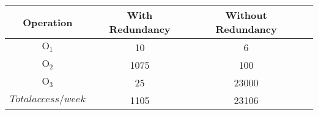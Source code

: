 \begin{table}[!h]
	\begin{center}
		\begin{tabular}{ | c | c | c | c | }
			\hline
			\textbf{Operation} & \textbf{With Redundancy} & \textbf{Without Redundancy} \\ \hline
			$ \textrm{O}_\textrm{1} $ & 10 & 6\\ \hline
			$ \textrm{O}_\textrm{2} $ & 1075 & 100 \\ \hline
			$ \textrm{O}_\textrm{3} $ & 25 & 23000 \\\hline
			$ Total access/week $ & 1105 & 23106 \\\hline
		\end{tabular}
	\end{center}
\end{table}

